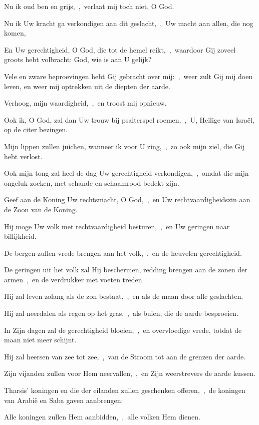 \documentclass[12pt,twoside,a5paper]{article}
\begin{document}
\begin{halfparskip}
  Nu ik oud ben en grijs,~\sep\ verlaat mij toch niet, O God.

  Nu ik Uw kracht ga verkondigen aan dit geslacht,~\sep\ Uw macht aan allen, die nog komen,

  En Uw gerechtigheid, O God, die tot de hemel reikt,~\sep\ waardoor Gij zoveel groots hebt volbracht: God, wie is aan U gelijk?

  Vele en zware beproevingen hebt Gij gebracht over mij:~\sep\ weer zult Gij mij doen leven, en weer mij optrekken uit de diepten der aarde.

  Verhoog, mijn waardigheid,~\sep\ en troost mij opnieuw.

  Ook ik, O God, zal dan Uw trouw bij psalterspel roemen,~\sep\ U, Heilige van Israël, op de citer bezingen.

  Mijn lippen zullen juichen, wanneer ik voor U zing,~\sep\ zo ook mijn ziel, die Gij hebt verlost.

  Ook mijn tong zal heel de dag Uw gerechtigheid verkondigen,~\sep\ omdat die mijn ongeluk zoeken, met schande en schaamrood bedekt zijn.

   Geef aan de Koning Uw rechtsmacht, O God,~\sep\ en Uw rechtvaardigheidszin aan de Zoon van de Koning.

  Hij moge Uw volk met rechtvaardigheid besturen,~\sep\ en Uw geringen naar billijkheid.

  De bergen zullen vrede brengen aan het volk,~\sep\ en de heuvelen gerechtigheid.

  De geringen uit het volk zal Hij beschermen, redding brengen aan de zonen der armen~\sep\ en de verdrukker met voeten treden.

  Hij zal leven zolang als de zon bestaat,~\sep\ en als de maan door alle geslachten.

  Hij zal neerdalen als regen op het gras,~\sep\ als buien, die de aarde besproeien.

  In Zijn dagen zal de gerechtigheid bloeien,~\sep\ en overvloedige vrede, totdat de maan niet meer schijnt.

  Hij zal heersen van zee tot zee,~\sep\ van de Stroom tot aan de grenzen der aarde.

  Zijn vijanden zullen voor Hem neervallen,~\sep\ en Zijn weerstrevers de aarde kussen.

  Tharsis' koningen en die der eilanden zullen geschenken offeren,~\sep\ de koningen van Arabië en Saba gaven aanbrengen:

  Alle koningen zullen Hem aanbidden,~\sep\ alle volken Hem dienen.


\end{halfparskip}
\end{document}
